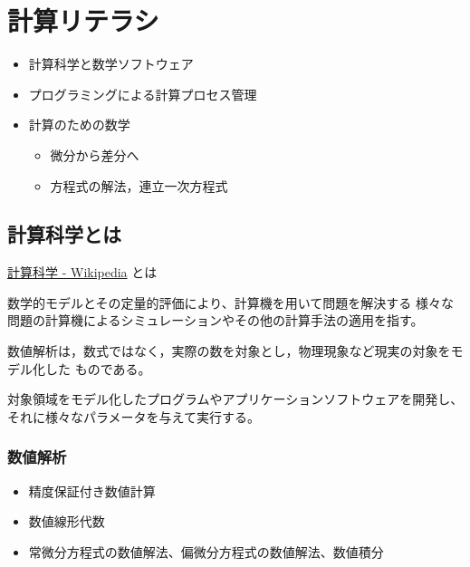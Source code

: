 \documentclass[dvipdfmx,11pat]{jarticle}
\begin{document}
\section{計算リテラシ}
\label{sec:orgd5a0748}
\begin{itemize}
\item 計算科学と数学ソフトウェア
\item プログラミングによる計算プロセス管理
\item 計算のための数学
\begin{itemize}
\item 微分から差分へ
\item 方程式の解法，連立一次方程式
\end{itemize}
\end{itemize}

\subsection{計算科学とは}
\label{sec:orge121d5e}

\href{https://ja.wikipedia.org/wiki/\%E8\%A8\%88\%E7\%AE\%97\%E7\%A7\%91\%E5\%AD\%A6}{計算科学 - Wikipedia} とは

数学的モデルとその定量的評価により、計算機を用いて問題を解決する
様々な問題の計算機によるシミュレーションやその他の計算手法の適用を指す。


数値解析は，数式ではなく，実際の数を対象とし，物理現象など現実の対象をモデル化した
ものである。

対象領域をモデル化したプログラムやアプリケーションソフトウェアを開発し、
それに様々なパラメータを与えて実行する。

\subsubsection{数値解析}
\label{sec:org695356b}
\begin{itemize}
\item 精度保証付き数値計算
\item 数値線形代数
\item 常微分方程式の数値解法、偏微分方程式の数値解法、数値積分
\end{itemize}
\end{document}
